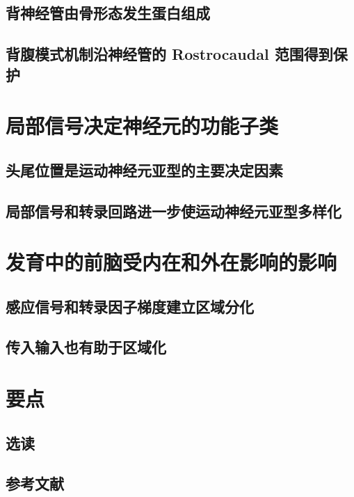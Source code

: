\subsection{背神经管由骨形态发生蛋白组成}
\subsection{背腹模式机制沿神经管的 Rostrocaudal 范围得到保护}

\section{局部信号决定神经元的功能子类}
\subsection{头尾位置是运动神经元亚型的主要决定因素}
\subsection{局部信号和转录回路进一步使运动神经元亚型多样化}

\section{发育中的前脑受内在和外在影响的影响}
\subsection{感应信号和转录因子梯度建立区域分化}
\subsection{传入输入也有助于区域化}

\section{要点}
\subsection{选读}
\subsection{参考文献}
